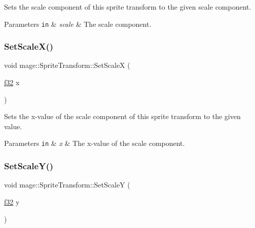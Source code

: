 Sets the scale component of this sprite transform to the given scale component.


\begin{DoxyParams}[1]{Parameters}
\mbox{\tt in}  & {\em scale} & The scale component. \\
\hline
\end{DoxyParams}
\hypertarget{structmage_1_1_sprite_transform_a48f6fc9be7449427212b8ea1611a0780}{}\label{structmage_1_1_sprite_transform_a48f6fc9be7449427212b8ea1611a0780} 
\subsubsection{\texorpdfstring{Set\+Scale\+X()}{SetScaleX()}}
{\footnotesize\ttfamily void mage\+::\+Sprite\+Transform\+::\+Set\+ScaleX (\begin{DoxyParamCaption}\item[{\hyperlink{namespacemage_a6a44ad388483959dc4dff9f2aef91431}{f32}}]{x }\end{DoxyParamCaption})\hspace{0.3cm}{\ttfamily [noexcept]}}

Sets the x-\/value of the scale component of this sprite transform to the given value.


\begin{DoxyParams}[1]{Parameters}
\mbox{\tt in}  & {\em x} & The x-\/value of the scale component. \\
\hline
\end{DoxyParams}
\hypertarget{structmage_1_1_sprite_transform_a86da604cef81c7df4121aadf08dc6ab0}{}\label{structmage_1_1_sprite_transform_a86da604cef81c7df4121aadf08dc6ab0} 
\subsubsection{\texorpdfstring{Set\+Scale\+Y()}{SetScaleY()}}
{\footnotesize\ttfamily void mage\+::\+Sprite\+Transform\+::\+Set\+ScaleY (\begin{DoxyParamCaption}\item[{\hyperlink{namespacemage_a6a44ad388483959dc4dff9f2aef91431}{f32}}]{y }\end{DoxyParamCaption})\hspace{0.3cm}{\ttfamily [noexcept]}}

